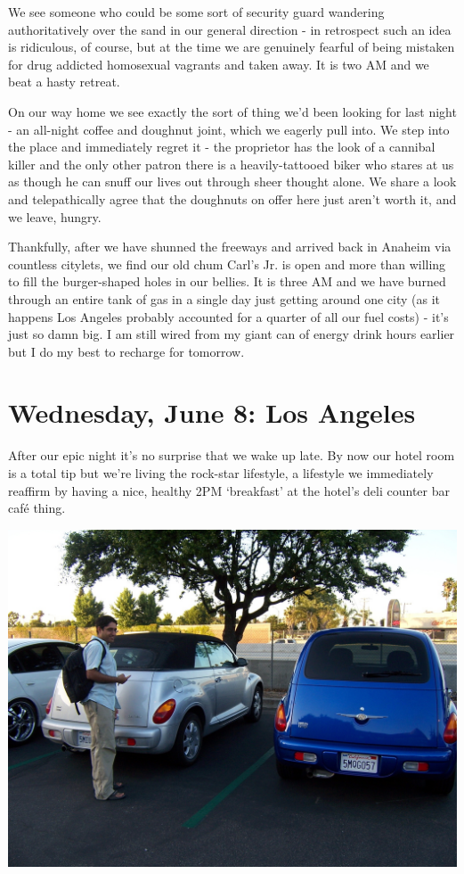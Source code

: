 \documentclass[a5paper,titlepage,11pt]{book}
\begin{document}
We see someone who could be some sort of security guard wandering authoritatively over the sand in our general direction - in retrospect such an idea is ridiculous, of course, but at the time we are genuinely fearful of being mistaken for drug addicted homosexual vagrants and taken away. It is two AM and we beat a hasty retreat.

On our way home we see exactly the sort of thing we'd been looking for last night - an all-night coffee and doughnut joint, which we eagerly pull into. We step into the place and immediately regret it - the proprietor has the look of a cannibal killer and the only other patron there is a heavily-tattooed biker who stares at us as though he can snuff our lives out through sheer thought alone. We share a look and telepathically agree that the doughnuts on offer here just aren't worth it, and we leave, hungry.

Thankfully, after we have shunned the freeways and arrived back in Anaheim via countless citylets, we find our old chum Carl's Jr. is open and more than willing to fill the burger-shaped holes in our bellies. It is three AM and we have burned through an entire tank of gas in a single day just getting around one city (as it happens Los Angeles probably accounted for a quarter of all our fuel costs) - it's just so damn big. I am still wired from my giant can of energy drink hours earlier but I do my best to recharge for tomorrow.

\chapter[Los Angeles]{Wednesday, June 8: Los Angeles}
After our epic night it's no surprise that we wake up late. By now our hotel room is a total tip but we're living the rock-star lifestyle, a lifestyle we immediately reaffirm by having a nice, healthy 2PM `breakfast' at the hotel's deli counter bar caf\'{e} thing.

\begin{center}\includegraphics[width=\textwidth]{gfx/100_1793}\end{center}
\end{document}

